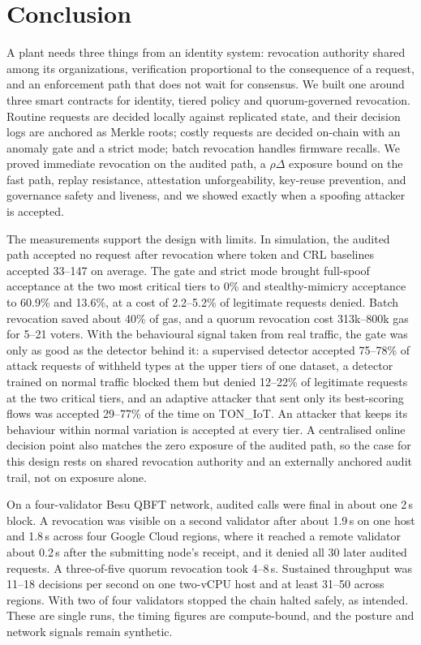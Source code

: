 \section{Conclusion}\label{sec:concl}
A plant needs three things from an identity system: revocation authority shared among its organizations, verification proportional to the consequence of a request, and an enforcement path that does not wait for consensus. We built one around three smart contracts for identity, tiered policy and quorum-governed revocation. Routine requests are decided locally against replicated state, and their decision logs are anchored as Merkle roots; costly requests are decided on-chain with an anomaly gate and a strict mode; batch revocation handles firmware recalls. We proved immediate revocation on the audited path, a $\rho\Delta$ exposure bound on the fast path, replay resistance, attestation unforgeability, key-reuse prevention, and governance safety and liveness, and we showed exactly when a spoofing attacker is accepted.

The measurements support the design with limits. In simulation, the audited path accepted no request after revocation where token and CRL baselines accepted 33--147 on average. The gate and strict mode brought full-spoof acceptance at the two most critical tiers to 0\% and stealthy-mimicry acceptance to 60.9\% and 13.6\%, at a cost of 2.2--5.2\% of legitimate requests denied. Batch revocation saved about 40\% of gas, and a quorum revocation cost 313k--800k gas for 5--21 voters. With the behavioural signal taken from real traffic, the gate was only as good as the detector behind it: a supervised detector accepted 75--78\% of attack requests of withheld types at the upper tiers of one dataset, a detector trained on normal traffic blocked them but denied 12--22\% of legitimate requests at the two critical tiers, and an adaptive attacker that sent only its best-scoring flows was accepted 29--77\% of the time on TON\_IoT. An attacker that keeps its behaviour within normal variation is accepted at every tier. A centralised online decision point also matches the zero exposure of the audited path, so the case for this design rests on shared revocation authority and an externally anchored audit trail, not on exposure alone.

On a four-validator Besu QBFT network, audited calls were final in about one 2\,s block. A revocation was visible on a second validator after about 1.9\,s on one host and 1.8\,s across four Google Cloud regions, where it reached a remote validator about 0.2\,s after the submitting node's receipt, and it denied all 30 later audited requests. A three-of-five quorum revocation took 4--8\,s. Sustained throughput was 11--18 decisions per second on one two-vCPU host and at least 31--50 across regions. With two of four validators stopped the chain halted safely, as intended. These are single runs, the timing figures are compute-bound, and the posture and network signals remain synthetic.

